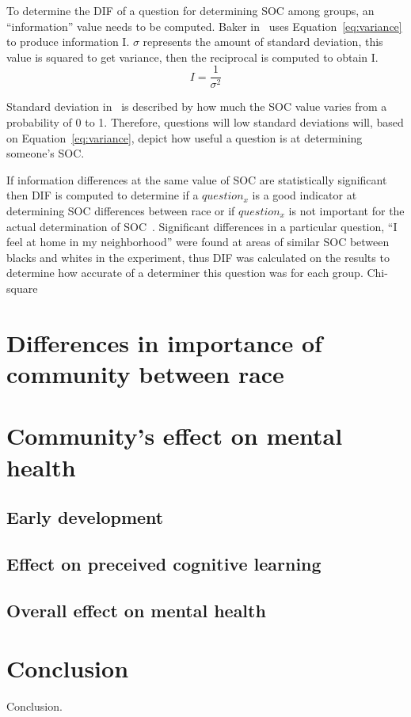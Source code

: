 \documentclass{sig-alternate}
\begin{document}
To determine the DIF of a question for determining SOC among groups, an ``information'' value needs to be computed. Baker in~\cite{irt:2001} uses Equation~\ref{eq:variance} to produce information I. $\sigma$ represents the amount of standard deviation, this value is squared to get variance, then the reciprocal is computed to obtain I.
\begin{equation}
\label{eq:variance}
I =  \frac{1}{  \sigma ^{2} } 
\end{equation}

Standard deviation in~\cite{disparities:2009} is described by how much the SOC value varies from a probability of 0 to 1. Therefore, questions will low standard deviations will, based on Equation~\ref{eq:variance}, depict how useful a question is at determining someone's SOC. 

If information differences at the same value of SOC are statistically significant then DIF is computed to determine if a $question_x$ is a good indicator at determining SOC differences between race or if $question_x$ is not important for the actual determination of SOC~\cite{disparities:2009}.
Significant differences in a particular question, ``I feel at home in my neighborhood'' were found at areas of similar SOC between blacks and whites in the experiment, thus DIF was calculated on the results to determine how accurate of a determiner this question was for each group. Chi-square 



\section{Differences in importance of community between race}


\section{Community's effect on mental health}
\subsection{Early development}
\subsection{Effect on preceived cognitive learning}
\subsection{Overall effect on mental health}



\section{Conclusion}
Conclusion.

\nocite{*}



\end{document}
